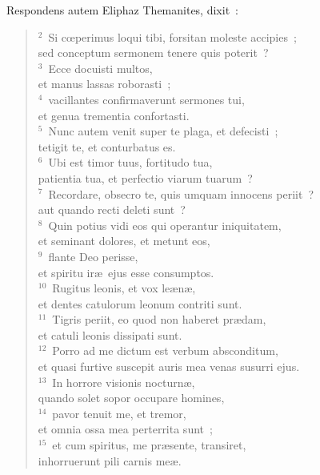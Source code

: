 \lettrine[lines=10,image=true,loversize=0.05,lraise=-0.03]{R}{}espondens autem Eliphaz Themanites, dixit~:
\begin{flushleft}\begin{verse}\vspace{6pt}${}^{2}$~Si cœperimus loqui tibi, forsitan moleste accipies~;\\ sed conceptum sermonem tenere quis poterit~?\\
${}^{3}$~Ecce docuisti multos,\\ et manus lassas roborasti~;\\
${}^{4}$~vacillantes confirmaverunt sermones tui,\\ et genua trementia confortasti.\\
${}^{5}$~Nunc autem venit super te plaga, et defecisti~;\\ tetigit te, et conturbatus es.\\
${}^{6}$~Ubi est timor tuus, fortitudo tua,\\ patientia tua, et perfectio viarum tuarum~?\\
${}^{7}$~Recordare, obsecro te, quis umquam innocens periit~?\\ aut quando recti deleti sunt~?\\
${}^{8}$~Quin potius vidi eos qui operantur iniquitatem,\\ et seminant dolores, et metunt eos,\\
${}^{9}$~flante Deo perisse,\\ et spiritu ir\ae\ ejus esse consumptos.\\
${}^{10}$~Rugitus leonis, et vox le\ae n\ae ,\\ et dentes catulorum leonum contriti sunt.\\
${}^{11}$~Tigris periit, eo quod non haberet pr\ae dam,\\ et catuli leonis dissipati sunt.\\
${}^{12}$~Porro ad me dictum est verbum absconditum,\\ et quasi furtive suscepit auris mea venas susurri ejus.\\
${}^{13}$~In horrore visionis nocturn\ae ,\\ quando solet sopor occupare homines,\\
${}^{14}$~pavor tenuit me, et tremor,\\ et omnia ossa mea perterrita sunt~;\\
${}^{15}$~et cum spiritus, me pr\ae sente, transiret,\\ inhorruerunt pili carnis me\ae .\\

\end{verse}
\end{flushleft}
